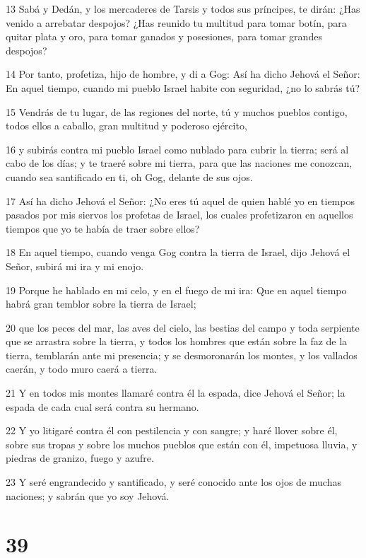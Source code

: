 \par 13 Sabá y Dedán, y los mercaderes de Tarsis y todos sus príncipes, te dirán: ¿Has venido a arrebatar despojos? ¿Has reunido tu multitud para tomar botín, para quitar plata y oro, para tomar ganados y posesiones, para tomar grandes despojos?
\par 14 Por tanto, profetiza, hijo de hombre, y di a Gog: Así ha dicho Jehová el Señor: En aquel tiempo, cuando mi pueblo Israel habite con seguridad, ¿no lo sabrás tú?
\par 15 Vendrás de tu lugar, de las regiones del norte, tú y muchos pueblos contigo, todos ellos a caballo, gran multitud y poderoso ejército,
\par 16 y subirás contra mi pueblo Israel como nublado para cubrir la tierra; será al cabo de los días; y te traeré sobre mi tierra, para que las naciones me conozcan, cuando sea santificado en ti, oh Gog, delante de sus ojos.
\par 17 Así ha dicho Jehová el Señor: ¿No eres tú aquel de quien hablé yo en tiempos pasados por mis siervos los profetas de Israel, los cuales profetizaron en aquellos tiempos que yo te había de traer sobre ellos?
\par 18 En aquel tiempo, cuando venga Gog contra la tierra de Israel, dijo Jehová el Señor, subirá mi ira y mi enojo.
\par 19 Porque he hablado en mi celo, y en el fuego de mi ira: Que en aquel tiempo habrá gran temblor sobre la tierra de Israel; 
\par 20 que los peces del mar, las aves del cielo, las bestias del campo y toda serpiente que se arrastra sobre la tierra, y todos los hombres que están sobre la faz de la tierra, temblarán ante mi presencia; y se desmoronarán los montes, y los vallados caerán, y todo muro caerá a tierra.
\par 21 Y en todos mis montes llamaré contra él la espada, dice Jehová el Señor; la espada de cada cual será contra su hermano.
\par 22 Y yo litigaré contra él con pestilencia y con sangre; y haré llover sobre él, sobre sus tropas y sobre los muchos pueblos que están con él, impetuosa lluvia, y piedras de granizo, fuego y azufre.
\par 23 Y seré engrandecido y santificado, y seré conocido ante los ojos de muchas naciones; y sabrán que yo soy Jehová.

\chapter{39}

